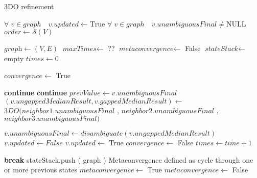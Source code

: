 \documentclass{article}
\begin{document}
\begin{algorithm}
\caption{3DO refinement}\label{euclid}
\begin{algorithmic}[1]
\Require $\forall \; v \in graph \quad v.updated \gets \text{True} $
\Require $\forall \; v \in graph \quad v.unambiguousFinal \neq \text{NULL}$
\State $\textit{order} \gets \mathcal{S}(V)$

\State $\textit{graph}           \gets (V,E)$
\State $\textit{maxTimes}        \gets$ ??
\State $\textit{metaconvergence} \gets$ False
\State $\textit{stateStack}      \gets$ empty
\State $\textit{times}           \gets 0$

\Repeat
    \State $convergence \gets$ True

            \State \textbf{continue}
            \State \textbf{continue}
        \Else 
            \State $prevValue \gets v.unambiguousFinal$ 
            \State {}
            \State $(v.ungappedMedianResult, v.gappedMedianResult) \gets$ 
            \State \quad \quad \quad \quad $3DO ( neighbor1.unambiguousFinal$
            \State \quad \quad \quad \quad \quad \quad , $neighbor2.unambiguousFinal$ 
            \State \quad \quad \quad \quad \quad \quad , $neighbor3.unambiguousFinal )$ 
            
            \State $v.unambiguousFinal \gets disambiguate ( v.ungappedMedianResult ) $
                \State $v.updated \gets False$
            \Else 
                \State $v.updated \gets$ \; True
                \State $convergence \gets$ \; False
            \EndIf
        \EndIf
        \State $times \gets time + 1$
    \EndFor

        \State \textbf{break}
    \Else
        \State stateStack.push ( graph )
            \Comment Metaconvergence defined as cycle through one or more previous states
                \State $metaconvergence \gets$ \; True
            \Else
                \State $metaconvergence \gets$ \; False
            \EndIf
    \EndIf


\end{algorithmic}
\end{algorithm}
\end{document}
